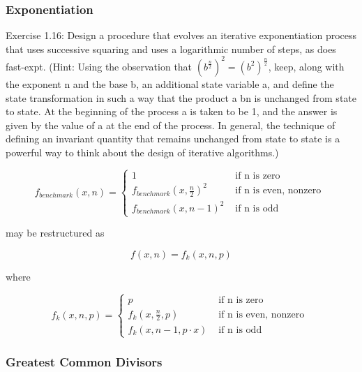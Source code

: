             \subsubsection{Exponentiation}
Exercise 1.16:  Design a procedure that evolves an iterative exponentiation process that uses successive squaring and uses a logarithmic number of steps, as does fast-expt.  (Hint: Using the observation that $\left(b^{\frac{n}{2}}\right)^2 = \left(b^2\right)^{\frac{n}{2}}$, keep, along with the exponent n and the base b, an additional state variable a, and define the state transformation in such a way that the product a bn is unchanged from state to state. At the beginning of the process a is taken to be 1, and the answer is given by the value of a at the end of the process. In general, the technique of defining an invariant quantity that remains unchanged from state to state is a powerful way to think about the design of iterative algorithms.)

\begin{equation}
f_{benchmark}\left(x,n\right) =
\begin{cases}
1 & \mbox{ if n is zero } \\
f_{benchmark}\left(x,\frac{n}{2}\right)^{2} & \mbox{ if n is even, nonzero } \\
f_{benchmark}\left(x,n-1\right)^{2} & \mbox{ if n is odd }
\end{cases}
\label{eq:fast_expt_benchmark}
\end{equation}

may be restructured as

\begin{equation}
f\left(x,n\right) = f_{k}\left(x,n,p\right)
\label{eq:fast_expt_fast}
\end{equation}

where

\begin{equation}
f_{k}\left(x,n,p\right) =
\begin{cases}
p & \mbox{ if n is zero } \\
f_{k}\left(x,\frac{n}{2},p\right) & \mbox{ if n is even, nonzero } \\
f_{k}\left(x,n-1,p \cdot x\right) & \mbox{ if n is odd }
\end{cases}
\label{eq:fast_expt_fast_recur}
\end{equation}

            \subsubsection{Greatest Common Divisors}
